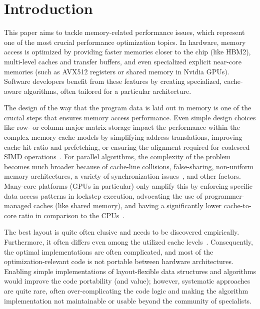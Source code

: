 \section{Introduction}

This paper aims to tackle memory-related performance issues, which represent one of the most crucial performance optimization topics. In hardware, memory access is optimized by providing faster memories closer to the chip (like HBM2), multi-level caches and transfer buffers, and even specialized explicit near-core memories (such as AVX512 registers or shared memory in Nvidia GPUs). Software developers benefit from these features by creating specialized, cache-aware algorithms, often tailored for a particular architecture.

The design of the way that the program data is laid out in memory is one of the crucial steps that ensures memory access performance. Even simple design choices like row- or column-major matrix storage impact the performance within the complex memory cache models by simplifying address translations, improving cache hit ratio and prefetching, or ensuring the alignment required for coalesced SIMD operations~\cite{clauss2000automatic,panda2001cache}. For parallel algorithms, the complexity of the problem becomes much broader because of cache-line collisions, false-sharing, non-uniform memory architectures, a variety of synchronization issues~\cite{bethel2015improving,heinecke2008parallel,weidendorfer2007latencies}, and other factors. Many-core platforms (GPUs in particular) only amplify this by enforcing specific data access patterns in lockstep execution, advocating the use of programmer-managed caches (like shared memory), and having a significantly lower cache-to-core ratio in comparison to the CPUs~\cite{guide2013cuda}.

The best layout is quite often elusive and needs to be discovered empirically. Furthermore, it often differs even among the utilized cache levels~\cite{weber2017matog,hawick2011hypercubic,krulivs2020detailed}. Consequently, the optimal implementations are often complicated, and most of the optimization-relevant code is not portable between hardware architectures. Enabling simple implementations of layout-flexible data structures and algorithms would improve the code portability (and value); however, systematic approaches are quite rare, often over-complicating the code logic and making the algorithm implementation not maintainable or usable beyond the community of specialists.


